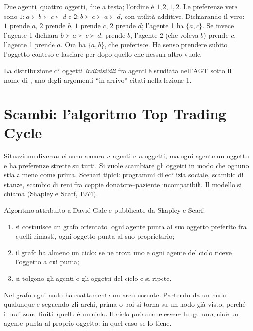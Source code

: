 \begin{esempio}
Due agenti, quattro oggetti, due a testa; l'ordine è $1, 2, 1, 2$. Le preferenze vere sono
$1: a \succ b \succ c \succ d$ e $2: b \succ c \succ a \succ d$, con utilità additive.
Dichiarando il vero: $1$ prende $a$, $2$ prende $b$, $1$ prende $c$, $2$ prende $d$;
l'agente 1 ha $\{a, c\}$. Se invece l'agente 1 dichiara $b \succ a \succ c \succ d$: prende
$b$, l'agente 2 (che voleva $b$) prende $c$, l'agente 1 prende $a$. Ora ha $\{a, b\}$, che
preferisce. Ha senso prendere subito l'oggetto conteso e lasciare per dopo quello che
nessun altro vuole.
\end{esempio}

La distribuzione di oggetti \emph{indivisibili} fra agenti è studiata nell'AGT sotto il
nome di , uno degli argomenti ``in arrivo'' citati
nella lezione 1.

\section{Scambi: l'algoritmo Top Trading Cycle}

Situazione diversa: ci sono ancora $n$ agenti e $n$ oggetti, ma ogni agente  un oggetto e ha preferenze strette su tutti. Si vuole scambiare gli oggetti in modo che
ognuno stia almeno come prima. Scenari tipici: programmi di edilizia sociale, scambio di
stanze, scambio di reni fra coppie donatore--paziente incompatibili. Il modello si chiama
 (Shapley e Scarf, 1974).

\begin{definizione}
Algoritmo attribuito a David Gale e pubblicato da Shapley e Scarf:
\begin{enumerate}
  \item si costruisce un grafo orientato: ogni agente punta al suo oggetto preferito fra
        quelli rimasti, ogni oggetto punta al suo proprietario;
  \item il grafo ha almeno un ciclo: se ne trova uno e ogni agente del ciclo riceve
        l'oggetto a cui punta;
  \item si tolgono gli agenti e gli oggetti del ciclo e si ripete.
\end{enumerate}
\end{definizione}

\begin{osservazione}
Nel grafo ogni nodo ha esattamente un arco uscente. Partendo da un nodo qualunque e
seguendo gli archi, prima o poi si torna su un nodo già visto, perché i nodi sono finiti:
quello è un ciclo. Il ciclo può anche essere lungo uno, cioè un agente punta al proprio
oggetto: in quel caso se lo tiene.
\end{osservazione}

